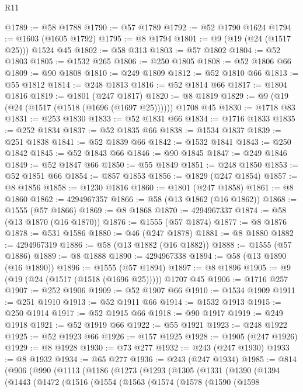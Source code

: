 \begin{lexlean}{R11}
\begin{coremodule}
@1789 := @58 @1788
@1790 := @57 @1789
@1792 := @52 @1790 @1624
@1794 := @1603 (@1605 @1792)
@1795 := @8 @1794
@1801 := @9 (@19 (@24 (@1517 @25))) @1524 @45
@1802 := @58 @313
@1803 := @57 @1802
@1804 := @52 @1803
@1805 := @1532 @265
@1806 := @250 @1805
@1808 := @52 @1806 @66
@1809 := @90 @1808
@1810 := @249 @1809
@1812 := @52 @1810 @66
@1813 := @55 @1812
@1814 := @248 @1813
@1816 := @52 @1814 @66
@1817 := @1804 @1816
@1819 := @1801 (@247 @1817)
@1820 := @8 @1819
@1829 := @9 (@19 (@24 (@1517 (@1518 (@1696 (@1697 @25)))))) @1708 @45
@1830 := @1718 @83
@1831 := @253 @1830
@1833 := @52 @1831 @66
@1834 := @1716 @1833
@1835 := @252 @1834
@1837 := @52 @1835 @66
@1838 := @1534 @1837
@1839 := @251 @1838
@1841 := @52 @1839 @66
@1842 := @1532 @1841
@1843 := @250 @1842
@1845 := @52 @1843 @66
@1846 := @90 @1845
@1847 := @249 @1846
@1849 := @52 @1847 @66
@1850 := @55 @1849
@1851 := @248 @1850
@1853 := @52 @1851 @66
@1854 := @857 @1853
@1856 := @1829 (@247 @1854)
@1857 := @8 @1856
@1858 := @1230 @1816
@1860 := @1801 (@247 @1858)
@1861 := @8 @1860
@1862 := 4294967357
@1866 := @58 (@13 @1862 (@16 @1862))
@1868 := @1555 (@57 @1866)
@1869 := @8 @1868
@1870 := 4294967337
@1874 := @58 (@13 @1870 (@16 @1870))
@1876 := @1555 (@57 @1874)
@1877 := @8 @1876
@1878 := @531 @1586
@1880 := @46 (@247 @1878)
@1881 := @8 @1880
@1882 := 4294967319
@1886 := @58 (@13 @1882 (@16 @1882))
@1888 := @1555 (@57 @1886)
@1889 := @8 @1888
@1890 := 4294967338
@1894 := @58 (@13 @1890 (@16 @1890))
@1896 := @1555 (@57 @1894)
@1897 := @8 @1896
@1905 := @9 (@19 (@24 (@1517 (@1518 (@1696 @25))))) @1707 @45
@1906 := @1716 @257
@1907 := @252 @1906
@1909 := @52 @1907 @66
@1910 := @1534 @1909
@1911 := @251 @1910
@1913 := @52 @1911 @66
@1914 := @1532 @1913
@1915 := @250 @1914
@1917 := @52 @1915 @66
@1918 := @90 @1917
@1919 := @249 @1918
@1921 := @52 @1919 @66
@1922 := @55 @1921
@1923 := @248 @1922
@1925 := @52 @1923 @66
@1926 := @157 @1925
@1928 := @1905 (@247 @1926)
@1929 := @8 @1928
@1930 := @73 @277
@1932 := @243 (@247 @1930)
@1933 := @8 @1932
@1934 := @65 @277
@1936 := @243 (@247 @1934)
@1985 := @814
    (@906
      (@990
        (@1113
          (@1186
            (@1273
              (@1293
                (@1305
                  (@1331
                    (@1390
                      (@1394
                        (@1443
                          (@1472
                            (@1516
                              (@1554
                                (@1563
                                  (@1574
                                    (@1578
                                      (@1590
                                        (@1598

\end{coremodule}
\end{lexlean}
